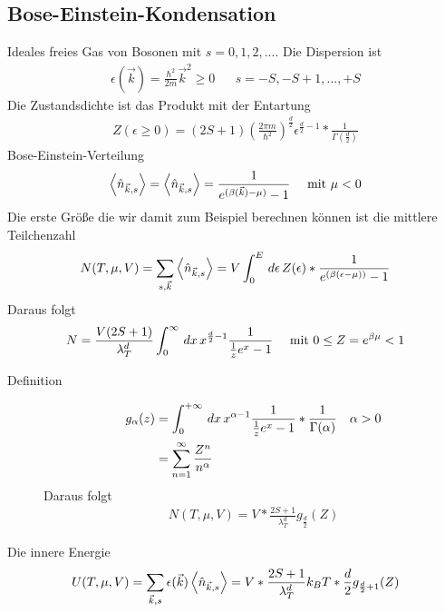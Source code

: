 \subsection*{Bose-Einstein-Kondensation}
Ideales freies Gas von Bosonen mit $s=0,1,2,...$.
Die Dispersion ist
%
\begin{align*}
  \epsilon(\vec{k}) = \frac{\hbar^2}{2m} \vec{k}^2 \ge 0 && s = -S, -S + 1, \ldots , +S
\end{align*}
%
Die Zustandsdichte ist das Produkt mit der Entartung
%
\begin{align*}
  Z(\epsilon \ge 0) = (2 S + 1)\left( \frac{2 \pi m}{\hbar^2}  \right)^{\frac{d}{2}}
  \epsilon^{\frac{d}{2} - 1} * \frac{1}{\Gamma\left( \frac{d}{2} \right)}
\end{align*}
%
Bose-Einstein-Verteilung 
%
\begin{align*}
  \Braket{\hat{n}_{\vec{k},s}} = \Braket{\hat{n}_{\vec{k},s}} = 
  \frac{1}{e^{(\beta(\vec{k}) - \mu)} - 1} && \text{ mit } \mu < 0
\end{align*}
%
Die erste Größe die wir damit zum Beispiel berechnen können ist die mittlere
Teilchenzahl
%
\begin{align*}
  N(T, \mu, V) = \sum_{s, \vec{k}}^{} \Braket{\hat{n}_{\vec{k},s}} = 
  V \int_{0}^{E} \,d\epsilon\, Z(\epsilon) * \frac{1}{e^{(\beta(\epsilon - \mu))} - 1}
\end{align*}
%
Daraus folgt
%
\begin{align*}
  N = \frac{V (2 S + 1) }{\lambda_T^d} \int_{0}^{\infty} \,dx\, x^{\frac{d}{2} - 1}
  \frac{1}{\frac{1}{z} e^{x} - 1} && \text{ mit } 0 \le Z = e^{\beta\mu} < 1
\end{align*}
%
\begin{description}
  \item[Definition] 
    \begin{align*}
      g_\alpha(z) & = \int_{0}^{+\infty} \,dx\, x^{\alpha-1} 
      \frac{1}{\frac{1}{z} e^x - 1} * \frac{1}{\Gamma(\alpha)} && \alpha > 0 \\
                                                               & = \sum_{n=1}^{\infty} 
      \frac{Z^n}{n^\alpha}
    \end{align*}
    Daraus folgt
    \begin{align*}
      N(T, \mu, V) = V * \frac{2S+1}{\lambda_T^d} g_{\frac{d}{2}}(Z)
    \end{align*}
\end{description}
Die innere Energie
%
\begin{align*}
  U(T, \mu, V) = \sum_{\vec{k},s}^{}\epsilon(\vec{k}) \Braket{\hat{n}_{\vec{k},s}}=
  V * \frac{2S+1}{\lambda_T^d} k_B T * \frac{d}{2} g_{\frac{d}{2} + 1}(Z)
\end{align*}
